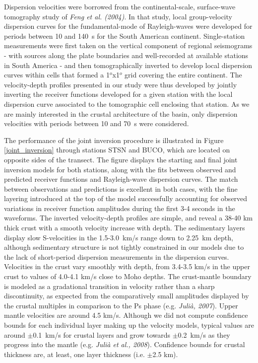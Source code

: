 \documentclass[manuscript,11pt]{geophysics}
\begin{document}
Dispersion velocities were borrowed from the continental-scale, surface-wave tomography study of \textit{Feng et al. (2004)}. In that study, local group-velocity dispersion curves for the fundamental-mode of Rayleigh-waves were developed for periods between 10 and 140~s for the South American continent. Single-station measurements were first taken on the vertical component of regional seismograms - with sources along the plate boundaries and well-recorded at available stations in South America - and then tomographically inverted to develop local dispersion curves within cells that formed a 1$^o$x1$^o$ grid covering the entire continent. The velocity-depth profiles presented in our study were thus developed by jointly inverting the receiver functions developed for a given station with the local dispersion curve associated to the tomographic cell enclosing that station. As we are mainly interested in the crustal architecture of the basin, only dispersion velocities with periods between 10 and 70~s were considered. 

The performance of the joint inversion procedure is illustrated in Figure \ref{joint_inversion} through stations STSN and BUCO, which are located on opposite sides of the transect. The figure displays the starting and final joint inversion models for both stations, along with the fits between observed and predicted receiver functions and Rayleigh-wave dispersion curves. The match between observations and predictions is excellent in both cases, with the fine layering introduced at the top of the model successfully accounting for observed variations in receiver function amplitudes during the first 3-4 seconds in the waveforms. The inverted velocity-depth profiles are simple, and reveal a 38-40 km thick crust with a smooth velocity increase with depth. The sedimentary layers display slow S-velocities in the 1.5-3.0~km/s range down to 2.25~km depth, although sedimentary structure is not tightly constrained in our models due to the lack of short-period dispersion measurements in the dispersion curves. Velocities in the crust vary smoothly with depth, from 3.4-3.5 km/s in the upper crust to values of 4.0-4.1 km/s close to Moho depths. The crust-mantle boundary is modeled as a gradational transition in velocity rather than a sharp discontinuity, as expected from the comparatively small amplitudes displayed by the crustal multiples in comparison to the Ps phase (e.g. \textit{Juli\`a, 2007}). Upper mantle velocities are around 4.5 km/s. Although we did not compute confidence bounds for each individual layer making up the velocity models, typical values are around $\pm$0.1~km/s for crustal layers and grow towards $\pm$0.2~km/s as they progress into the mantle (e.g. \textit{Juli\`a et al., 2008}). Confidence bounds for crustal thickness are, at least, one layer thickness (i.e. $\pm$2.5 km).
\end{document}
